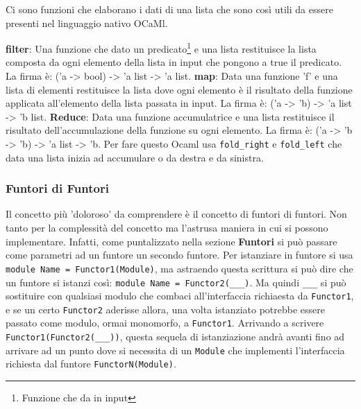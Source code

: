 \documentclass{article}
\begin{document}
\hspace*{0.5cm}Ci sono funzioni che elaborano i dati di una lista che sono così utili da essere presenti nel linguaggio nativo OCaMl.

\vspace*{0.5cm}

\hspace*{0.5cm}\textbf{filter}: Una funzione che dato un predicato\footnote{Funzione che da in input} e una lista restituisce la lista composta da ogni elemento della lista in input che pongono a true il predicato.
La firma è: ('a -> bool) -> 'a list -> 'a list.\newline
\hspace*{0.5cm}\textbf{map}: Data una funzione 'f' e una lista di elementi restituisce la lista dove ogni elemento è il risultato della funzione applicata all'elemento della lista passata in input.
La firma è: ('a -> 'b) -> 'a list -> 'b list.\newline
\hspace*{0.5cm}\textbf{Reduce}: Data una funzione accumulatrice e una lista restituisce il risultato dell'accumulazione della funzione su  ogni elemento.
La firma è: ('a -> 'b -> 'b) -> 'a list -> 'b.\newline
\hspace*{0.5cm}Per fare questo Ocaml usa \texttt{fold\_right} e \texttt{fold\_left} che data una lista inizia ad accumulare o da destra e da sinistra.

\subsubsection{Funtori di Funtori}

\vspace*{0.5cm}

\hspace*{0.5cm}Il concetto più 'doloroso' da comprendere è il concetto di funtori di funtori. 
Non tanto per la complessità del concetto ma l'astrusa maniera in cui si possono implementare.
Infatti, come puntalizzato nella sezione \textbf{Funtori} si può passare come parametri ad un funtore un secondo funtore.
Per istanziare in funtore si usa \texttt{module Name = Functor1(Module)}, ma astraendo questa scrittura si può dire che un funtore si istanzi così: \texttt{module Name = Functor2(\_\_\_)}.
Ma quindi \texttt{\_\_\_} si può sostituire con qualsiasi modulo che combaci all'interfaccia richiaesta da \texttt{Functor1}, e se un certo \texttt{Functor2} aderisse allora, una volta istanziato potrebbe essere passato come modulo, ormai monomorfo, a \texttt{Functor1}.
Arrivando a scrivere \texttt{Functor1(Functor2(\_\_\_))}, questa sequela di istanziazione andrà avanti fino ad arrivare ad un punto dove si necessita di un \texttt{Module} che implementi l'interfaccia richiesta dal funtore \texttt{FunctorN(Module)}.
\end{document}
